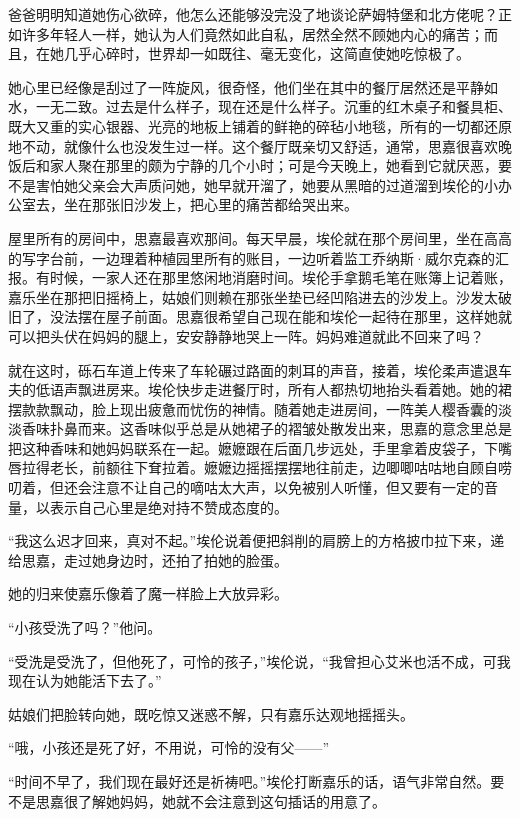 \par 爸爸明明知道她伤心欲碎，他怎么还能够没完没了地谈论萨姆特堡和北方佬呢？正如许多年轻人一样，她认为人们竟然如此自私，居然全然不顾她内心的痛苦；而且，在她几乎心碎时，世界却一如既往、毫无变化，这简直使她吃惊极了。
\par 她心里已经像是刮过了一阵旋风，很奇怪，他们坐在其中的餐厅居然还是平静如水，一无二致。过去是什么样子，现在还是什么样子。沉重的红木桌子和餐具柜、既大又重的实心银器、光亮的地板上铺着的鲜艳的碎毡小地毯，所有的一切都还原地不动，就像什么也没发生过一样。这个餐厅既亲切又舒适，通常，思嘉很喜欢晚饭后和家人聚在那里的颇为宁静的几个小时；可是今天晚上，她看到它就厌恶，要不是害怕她父亲会大声质问她，她早就开溜了，她要从黑暗的过道溜到埃伦的小办公室去，坐在那张旧沙发上，把心里的痛苦都给哭出来。
\par 屋里所有的房间中，思嘉最喜欢那间。每天早晨，埃伦就在那个房间里，坐在高高的写字台前，一边理着种植园里所有的账目，一边听着监工乔纳斯·威尔克森的汇报。有时候，一家人还在那里悠闲地消磨时间。埃伦手拿鹅毛笔在账簿上记着账，嘉乐坐在那把旧摇椅上，姑娘们则赖在那张坐垫已经凹陷进去的沙发上。沙发太破旧了，没法摆在屋子前面。思嘉很希望自己现在能和埃伦一起待在那里，这样她就可以把头伏在妈妈的腿上，安安静静地哭上一阵。妈妈难道就此不回来了吗？
\par 就在这时，砾石车道上传来了车轮碾过路面的刺耳的声音，接着，埃伦柔声遣退车夫的低语声飘进房来。埃伦快步走进餐厅时，所有人都热切地抬头看着她。她的裙摆款款飘动，脸上现出疲惫而忧伤的神情。随着她走进房间，一阵美人樱香囊的淡淡香味扑鼻而来。这香味似乎总是从她裙子的褶皱处散发出来，思嘉的意念里总是把这种香味和她妈妈联系在一起。嬷嬷跟在后面几步远处，手里拿着皮袋子，下嘴唇拉得老长，前额往下耷拉着。嬷嬷边摇摇摆摆地往前走，边唧唧咕咕地自顾自唠叨着，但还会注意不让自己的嘀咕太大声，以免被别人听懂，但又要有一定的音量，以表示自己心里是绝对持不赞成态度的。
\par “我这么迟才回来，真对不起。”埃伦说着便把斜削的肩膀上的方格披巾拉下来，递给思嘉，走过她身边时，还拍了拍她的脸蛋。
\par 她的归来使嘉乐像着了魔一样脸上大放异彩。
\par “小孩受洗了吗？”他问。
\par “受洗是受洗了，但他死了，可怜的孩子，”埃伦说，“我曾担心艾米也活不成，可我现在认为她能活下去了。”
\par 姑娘们把脸转向她，既吃惊又迷惑不解，只有嘉乐达观地摇摇头。
\par “哦，小孩还是死了好，不用说，可怜的没有父——”
\par “时间不早了，我们现在最好还是祈祷吧。”埃伦打断嘉乐的话，语气非常自然。要不是思嘉很了解她妈妈，她就不会注意到这句插话的用意了。
